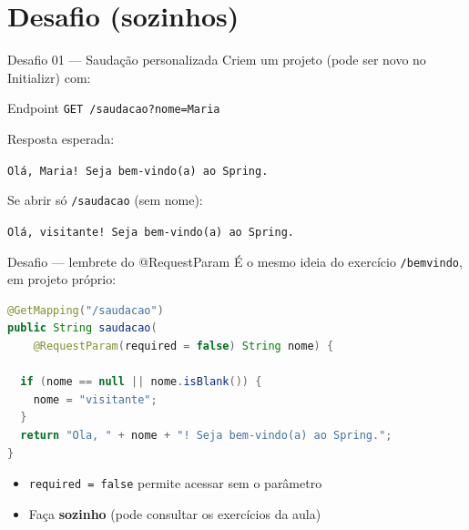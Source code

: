 \documentclass[aspectratio=169,11pt]{beamer}
\begin{document}
\section{Desafio (sozinhos)}

\begin{frame}{Desafio 01 --- Saudação personalizada}
  Criem um projeto (pode ser novo no Initializr) com:

  \vspace{0.5em}
  \begin{block}{Endpoint}
    \texttt{GET /saudacao?nome=Maria}
  \end{block}

  \vspace{0.3em}
  Resposta esperada:

  \begin{center}
    \texttt{Olá, Maria! Seja bem-vindo(a) ao Spring.}
  \end{center}

  \vspace{0.5em}
  Se abrir só \texttt{/saudacao} (sem nome):

  \begin{center}
    \texttt{Olá, visitante! Seja bem-vindo(a) ao Spring.}
  \end{center}
\end{frame}

\begin{frame}[fragile]{Desafio --- lembrete do @RequestParam}
  É o mesmo ideia do exercício \texttt{/bemvindo}, em projeto próprio:

\begin{lstlisting}[language=Java,basicstyle=\ttfamily\footnotesize]
@GetMapping("/saudacao")
public String saudacao(
    @RequestParam(required = false) String nome) {

  if (nome == null || nome.isBlank()) {
    nome = "visitante";
  }
  return "Ola, " + nome + "! Seja bem-vindo(a) ao Spring.";
}
\end{lstlisting}

  \vspace{0.3em}
  \begin{itemize}
    \item \texttt{required = false} permite acessar sem o parâmetro
    \item Faça \textbf{sozinho} (pode consultar os exercícios da aula)
  \end{itemize}
\end{frame}
\end{document}
